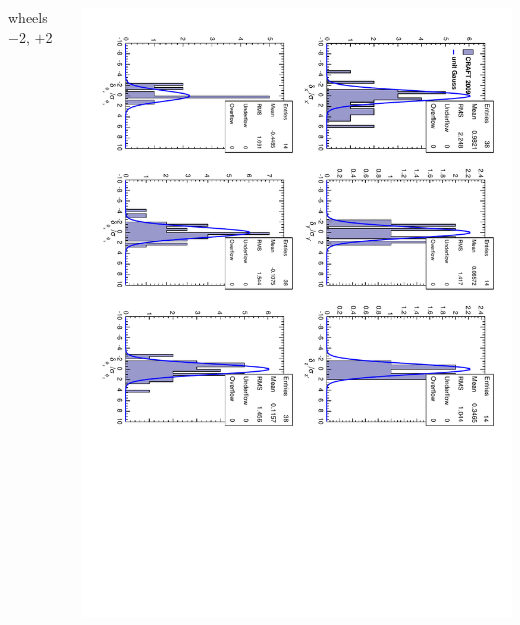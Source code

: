\documentclass[compress]{beamer}
\begin{document}
\begin{frame}
\begin{columns}
\begin{center}
wheels $-$2, $+$2
\end{center}
\includegraphics[height=\linewidth, angle=90]{tecnorm_outer.pdf}
\end{columns}
\end{frame}
\end{document}
